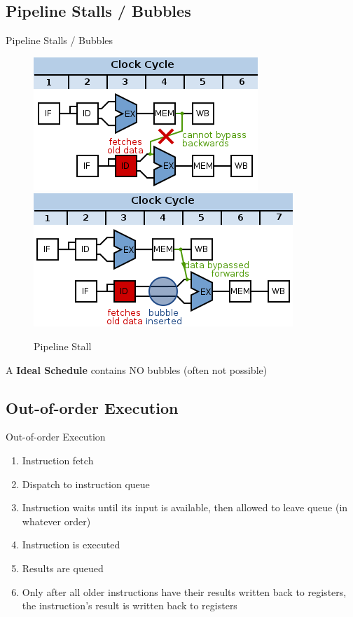 \documentclass{beamer}
\begin{document}
\begin{darkframes}
\subsection{Pipeline Stalls / Bubbles}
\begin{frame}{Pipeline Stalls / Bubbles}
\begin{figure}
\includegraphics[scale=0.4]{figures/bubbles}
\includegraphics[scale=0.4]{figures/bubbles2}
\caption{Pipeline Stall}
\end{figure}

A {\bf \color{green} Ideal Schedule} contains NO bubbles (often not possible)
\end{frame}

\subsection{Out-of-order Execution}
\begin{frame}{Out-of-order Execution}
	\begin{enumerate}
		\item Instruction fetch
		\item Dispatch to instruction queue
		\item Instruction waits until its input is available, then allowed to leave queue (in whatever order)
		\item Instruction is executed
		\item Results are queued
		\item Only after all older instructions have their results written back to registers, the instruction's result is written back to registers 
	\end{enumerate}
\end{frame}


\end{darkframes}
\end{document}
